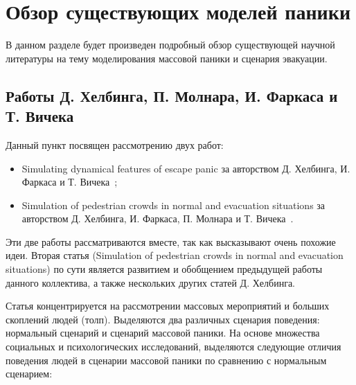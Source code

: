 \section{Обзор существующих моделей паники}
\label{sec:overview}

В данном разделе будет произведен подробный обзор существующей научной литературы на тему моделирования массовой паники и сценария эвакуации.

\subsection{Работы Д. Хелбинга, П. Молнара, И. Фаркаса и Т. Вичека}
\label{sub:overview:helbing}

Данный пункт посвящен рассмотрению двух работ:

\begin{itemize}
  \item Simulating dynamical features of escape panic за авторством Д. Хелбинга, И. Фаркаса и Т. Вичека~\cite{helbing_escape_panic};
  \item Simulation of pedestrian crowds in normal and evacuation situations за авторством Д. Хелбинга, И. Фаркаса, П. Молнара и Т. Вичека~\cite{helbing_evacuation}.
\end{itemize}

Эти две работы рассматриваются вместе, так как высказывают очень похожие идеи.
Вторая статья (Simulation of pedestrian crowds in normal and evacuation situations) по сути является развитием и обобщением предыдущей работы данного коллектива,
а также нескольких других статей Д. Хелбинга.

Статья концентрируется на рассмотрении массовых мероприятий и больших скоплений людей (толп).
Выделяются два различных сценария поведения: нормальный сценарий и сценарий массовой паники.
На основе множества социальных и психологических исследований, выделяются следующие отличия поведения людей в сценарии массовой паники по сравнению с нормальным сценарием:

